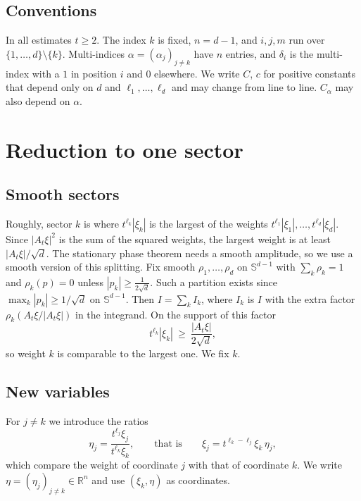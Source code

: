 \documentclass[11pt]{article}
\theoremstyle{remark}
\newcommand{\R}{\mathbb{R}}
\begin{document}
\subsection{Conventions}

In all estimates $t\ge2$. The index $k$ is fixed, $n=d-1$, and $i,j,m$ run over
$\{1,\dots,d\}\setminus\{k\}$. Multi-indices $\alpha=(\alpha_j)_{j\ne k}$ have $n$
entries, and $\delta_i$ is the multi-index with a $1$ in position $i$ and $0$
elsewhere. We write $C$, $c$ for positive constants that depend only on $d$ and
$\ell_1,\dots,\ell_d$ and may change from line to line. $C_\alpha$ may also depend
on $\alpha$.

\section{Reduction to one sector}\label{sec:reduction}

\subsection{Smooth sectors}

Roughly, sector $k$ is where $t^{\ell_k}|\xi_k|$ is the largest of the weights
$t^{\ell_1}|\xi_1|,\dots,t^{\ell_d}|\xi_d|$. Since $|A_t\xi|^2$ is the sum of the
squared weights, the largest weight is at least $|A_t\xi|/\sqrt d$. The stationary
phase theorem needs a smooth amplitude, so we use a smooth version of this
splitting. Fix smooth $\rho_1,\dots,\rho_d$ on $\mathbb S^{d-1}$ with
$\sum_k\rho_k=1$ and $\rho_k(p)=0$ unless $|p_k|\ge\frac1{2\sqrt d}$. Such a partition
exists since $\max_k|p_k|\ge1/\sqrt d$ on $\mathbb S^{d-1}$. Then $I=\sum_kI_k$,
where $I_k$ is $I$ with the extra factor $\rho_k(A_t\xi/|A_t\xi|)$ in the integrand.
On the support of this factor
\begin{equation}\label{eq:dominant}
t^{\ell_k}|\xi_k|\ \ge\ \frac{|A_t\xi|}{2\sqrt d},
\end{equation}
so weight $k$ is comparable to the largest one. We fix $k$.

\subsection{New variables}

For $j\ne k$ we introduce the ratios
\[
\eta_j=\frac{t^{\ell_j}\xi_j}{t^{\ell_k}\xi_k},
\qquad\text{that is}\qquad
\xi_j=t^{\ell_k-\ell_j}\xi_k\,\eta_j ,
\]
which compare the weight of coordinate $j$ with that of coordinate $k$. We write
$\eta=(\eta_j)_{j\ne k}\in\R^n$ and use $(\xi_k,\eta)$ as coordinates.
\end{document}
